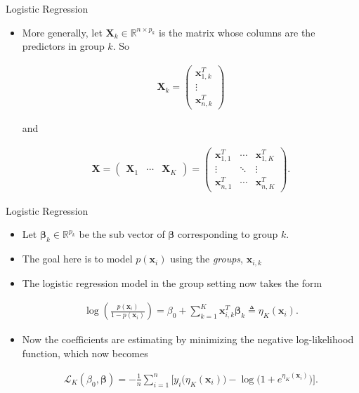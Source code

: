 \documentclass[8pt]{beamer}
\begin{document}
\begin{frame}{Logistic Regression}
\begin{itemize}
    \item More generally, let $\mathbf{X}_k \in \mathbb{R}^{n \times p_k}$ is the matrix whose columns are the predictors in group $k$. So 

\begin{align*}
    \mathbf{X}_k = \begin{pmatrix}
    \bm{x}_{1,k}^T \\
    \vdots \\
    \bm{x}_{n,k}^T
    \end{pmatrix}
\end{align*}

and 

\begin{align*}
\mathbf{X} = \begin{pmatrix}
\mathbf{X}_1 & \cdots & \mathbf{X}_K
\end{pmatrix} = \begin{pmatrix}
\bm{x}_{1,1}^T & \cdots & \bm{x}_{1,K}^T \\
\vdots & \ddots & \vdots \\
\bm{x}_{n,1}^T & \cdots & \bm{x}_{n,K}^T
\end{pmatrix}.
\end{align*}

\end{itemize}
\end{frame}

\begin{frame}{Logistic Regression}
\begin{itemize}
    \item Let $\bm{\beta}_k \in \mathbb{R}^{p_k}$ be the sub vector of $\bm{\beta}$ corresponding to group $k$. 
    \item The goal here is to model $p(\bm{x}_i)$ using the \textit{groups}, $\bm{x}_{i,k}$
    \item The logistic regression model in the group setting now takes the form 
    
\begin{align}
    \label{logreggroup}
        \log \left( \frac{p(\bm{x}_i)}{1 - p(\bm{x}_i)} \right) = \beta_0 + \sum_{k=1}^K \bm{x}_{i,k}^T \bm{\beta}_k \triangleq \eta_K(\bm{x}_i).
\end{align}

    \item Now the coefficients are estimating by minimizing the negative log-likelihood function, which now becomes 
    
\begin{align}
    \label{negloglikegroup}
        \mathcal{L}_K(\beta_0, \bm{\beta}) = - \frac{1}{n} \sum_{i = 1}^n \Big[ y_i\big(\eta_K(\bm{x}_i)\big) - \log \big(1 + e^{\eta_K(\bm{x}_i)}  \big) \Big].
\end{align}

\end{itemize}
\end{frame}
\end{document}
